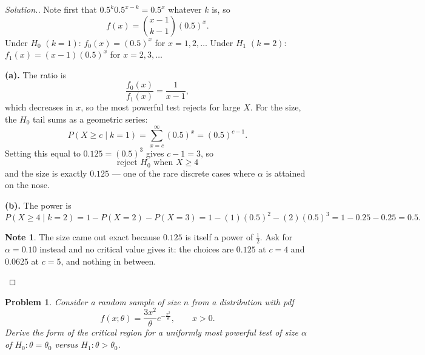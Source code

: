 \documentclass[12pt,a4paper]{report}
\theoremstyle{definition}
\newtheorem{note}[thm]{Note}
\theoremstyle{plain}
\newtheorem{problemx}{Problem}[section]
\newenvironment{problem}{\begin{problemx}}{\end{problemx}}
\newenvironment{solution}
  {\renewcommand{\qedsymbol}{}\begin{proof}[\textit{Solution}.]}
  {\end{proof}}
\begin{document}
\begin{solution}
Note first that $0.5^k0.5^{x-k}=0.5^x$ whatever $k$ is, so
\[f(x)=\binom{x-1}{k-1}(0.5)^x.\]
Under $H_0$ $(k=1)$: $f_0(x)=(0.5)^x$ for $x=1,2,\ldots$
Under $H_1$ $(k=2)$: $f_1(x)=(x-1)(0.5)^x$ for $x=2,3,\ldots$

\textbf{(a).} The ratio is
\[\frac{f_0(x)}{f_1(x)}=\frac{1}{x-1},\]
which decreases in $x$, so the most powerful test rejects for large $X$. For the
size, the $H_0$ tail sums as a geometric series:
\[P(X\geq c\mid k=1)=\sum_{x=c}^{\infty}(0.5)^x=(0.5)^{c-1}.\]
Setting this equal to $0.125=(0.5)^3$ gives $c-1=3$, so
\[\boxed{\ \text{reject } H_0 \text{ when } X\geq 4\ }\]
and the size is exactly $0.125$ --- one of the rare discrete cases where $\alpha$
is attained on the nose.

\textbf{(b).} The power is
\[P(X\geq 4\mid k=2)=1-P(X=2)-P(X=3)
=1-(1)(0.5)^2-(2)(0.5)^3=1-0.25-0.25=0.5.\]

\begin{note}
The size came out exact because $0.125$ is itself a power of $\frac12$. Ask for
$\alpha=0.10$ instead and no critical value gives it: the choices are $0.125$ at
$c=4$ and $0.0625$ at $c=5$, and nothing in between.
\end{note}
\end{solution}

\begin{problem}
Consider a random sample of size $n$ from a distribution with pdf
\[f(x;\theta)=\frac{3x^2}{\theta}e^{-\frac{x^3}{\theta}},\qquad x>0.\]
Derive the form of the critical region for a uniformly most powerful test of size
$\alpha$ of $H_0:\theta=\theta_0$ versus $H_1:\theta>\theta_0$.
\end{problem}
\end{document}
